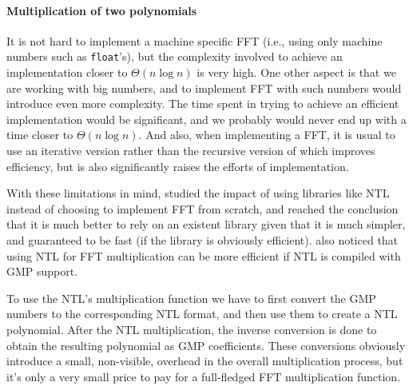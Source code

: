 \paragraph*{Multiplication of two polynomials}
It is not hard to implement a machine specific FFT (i.e., using only machine
numbers such as \texttt{float}'s), but the complexity involved to achieve an
implementation closer to $\Theta(n \log{n})$ is very high. One other aspect is
that we are working with big numbers, and to implement FFT with such numbers
would introduce even more complexity.
The time spent in trying to achieve an efficient implementation would be
significant, and we probably would never end up with a time closer to $\Theta(n
\log{n})$. And also, when implementing a FFT, it is usual to use an iterative
version rather than the recursive version of  which improves
efficiency, but is also significantly raises the efforts of implementation.

With these limitations in mind, \textcite{Fateman:2010} studied the impact of
using libraries like NTL instead of choosing to implement FFT from scratch, and
reached the conclusion that it is much better to rely on an existent library
given that it is much simpler, and guaranteed to be fast (if the library is
obviously efficient).
\citeauthor{Fateman:2010} also noticed that using NTL for FFT multiplication
can be more efficient if NTL is compiled with GMP support\footnotemark.


To use the NTL's multiplication function we have to first convert the GMP
numbers to the corresponding NTL format, and then use them to create a NTL
polynomial. After the NTL multiplication, the inverse conversion is done to
obtain the resulting polynomial as GMP coefficients.  These conversions
obviously introduce a small, non-visible, overhead in the overall
multiplication process, but it's only a very small price to pay for
a full-fledged FFT multiplication function.

